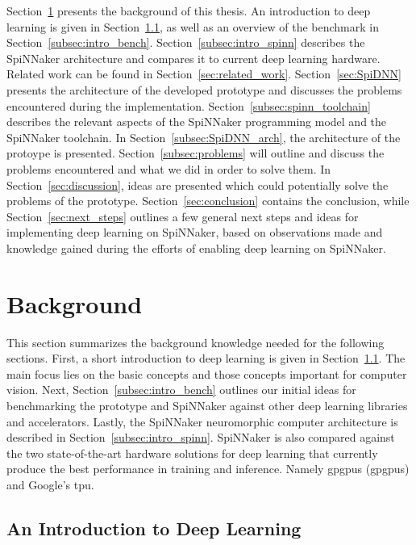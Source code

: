 \documentclass[]{article}
\begin{document}
Section~\ref{sec:background} presents the background of this thesis.
An introduction to deep learning is given in
Section~\ref{subsec:intro_dl}, as well as an overview
of the benchmark in Section~\ref{subsec:intro_bench}.
Section~\ref{subsec:intro_spinn} describes the SpiNNaker architecture
and compares it to current deep learning hardware.
Related work can be found in Section~\ref{sec:related_work}.
Section~\ref{sec:SpiDNN} presents the architecture of the
developed prototype and discusses the problems encountered during
the implementation.
Section~\ref{subsec:spinn_toolchain} describes the relevant aspects
of the SpiNNaker programming model and the SpiNNaker toolchain.
In Section~\ref{subsec:SpiDNN_arch}, the architecture of the protoype
is presented.
Section~\ref{subsec:problems} will outline and discuss the problems
encountered and what we did in order to solve them.
In Section~\ref{sec:discussion}, ideas are presented which could
potentially solve the problems of the prototype.
Section~\ref{sec:conclusion} contains the conclusion, while
Section~\ref{sec:next_steps} outlines a few general next steps and
ideas for implementing deep learning on SpiNNaker, based on
observations made and knowledge gained during the efforts of enabling
deep learning on SpiNNaker.



\section{Background} %
\label{sec:background}

This section summarizes the background knowledge needed for the
following sections.
First, a short introduction to deep learning is given in
Section~\ref{subsec:intro_dl}.
The main focus lies on the basic concepts and those concepts important
for computer vision.
Next, Section~\ref{subsec:intro_bench} outlines our initial ideas for
benchmarking the prototype and SpiNNaker against other deep learning
libraries and accelerators.
Lastly, the SpiNNaker neuromorphic computer architecture is described
in Section~\ref{subsec:intro_spinn}.
SpiNNaker is also compared against the two state-of-the-art hardware
solutions for deep learning that currently produce the best
performance in training and inference.
Namely \acrlong{gpgpu}s (\acrshort{gpgpu}s) and
Google's \acrfull{tpu}.


\subsection{An Introduction to Deep Learning} %
\label{subsec:intro_dl}
\end{document}
